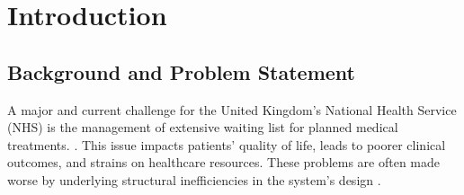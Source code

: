 \documentclass[ %
                    author={Nattanan Nawakitbamrung},
                supervisor={Dr. Sébastien Rochat},
                    degree={MSc},
                     title={Developing and Evaluating the Impact of a Single Patient Treatment List (PTL) for an NHS Integrated Care System},
                  subtitle={},
                      type={},
                      year={2025}]{dissertation}
\begin{document}
\mainmatter




 
\chapter{Introduction}
\label{chap:introduction}

\noindent
\section{Background and Problem Statement}
A major and current challenge for the United Kingdom's National Health Service (NHS) is the management of extensive waiting list for planned medical treatments. \cite{nuffield2024dashboard, kingsfund2024}. This issue impacts patients’ quality of life, leads to poorer clinical outcomes, and strains on healthcare resources. These problems are often made worse by underlying structural inefficiencies in the system's design \cite{nhs2024guide, nuffield2024hospital}.
\end{document}
